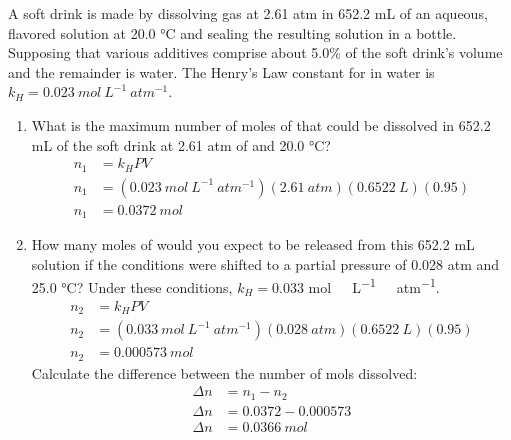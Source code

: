 \documentclass{article}
\begin{document}
A soft drink is made by dissolving  gas at 2.61 \si{atm} in 652.2 \si{mL} of an aqueous, flavored solution at 20.0 \si{\degreeCelsius} and sealing the resulting solution in a bottle. Supposing that various additives comprise about 5.0\% of the soft drink’s volume and the remainder is water. The Henry's Law constant for  in water is $k_{H}=0.023\ \si{mol\ L^{-1}\ atm^{-1}}$.

\begin{enumerate}
    \item What is the maximum number of moles of  that could be dissolved in 652.2 \si{mL} of the soft drink at 2.61 \si{atm} of  and 20.0 \si{\degreeCelsius}?
    \begin{align*}
        n_{1}&=k_{H}PV\\
        n_{1}&=(0.023\ \si{mol\ L^{-1}\ atm^{-1}})(2.61\ \si{atm})(0.6522\ \si{L})(0.95)\\
        n_{1}&=0.0372\ \si{mol}
    \end{align*}
    
    \item How many moles of  would you expect to be released from this 652.2 \si{mL} solution if the conditions were shifted to a  partial pressure of 0.028 \si{atm} and 25.0 \si{\degreeCelsius}? Under these conditions, $k_{H}=0.033$ \si{mol\ L^{-1}\ atm^{-1}}.
    \begin{align*}
        n_{2}&=k_{H}PV\\
        n_{2}&=(0.033\ \si{mol\ L^{-1}\ atm^{-1}})(0.028\ \si{atm})(0.6522\ \si{L})(0.95)\\
        n_{2}&=0.000573\ \si{mol}
    \end{align*}
    Calculate the difference between the number of mols dissolved:
    \begin{align*}
        \Delta n &= n_{1}-n_{2}\\
        \Delta n &= 0.0372 - 0.000573\\
        \Delta n &= 0.0366\ \si{mol}
    \end{align*}
    
\end{enumerate}
\end{document}
